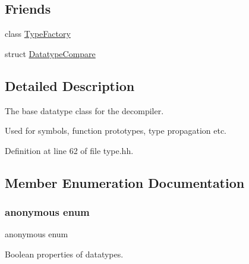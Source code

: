 \subsection*{Friends}
\begin{DoxyCompactItemize}
\item 
class \mbox{\hyperlink{class_datatype_ac8c1945d0a63785e78b3e09a13226ed6}{Type\+Factory}}
\item 
struct \mbox{\hyperlink{class_datatype_a86b144569a3593304a32cb5aae3fa3f6}{Datatype\+Compare}}
\end{DoxyCompactItemize}


\subsection{Detailed Description}
The base datatype class for the decompiler. 

Used for symbols, function prototypes, type propagation etc. 

Definition at line 62 of file type.\+hh.



\subsection{Member Enumeration Documentation}
\mbox{\label{class_datatype_abf6a43616e36ab43140d425fb8df3994}} 
\subsubsection{\texorpdfstring{anonymous enum}{anonymous enum}}
{\footnotesize\ttfamily anonymous enum\hspace{0.3cm}{\ttfamily [protected]}}



Boolean properties of datatypes. 

